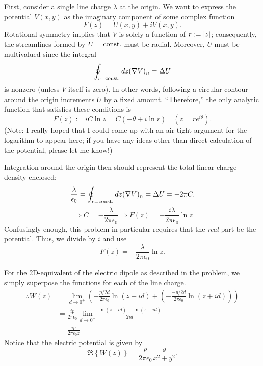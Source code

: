 \item

First, consider a single line charge $\lambda$ at the origin.
We want to express the potential $V(x, y)$ as the imaginary component of some complex function
\[
    F(z) = U(x, y) + iV(x, y).
\]
Rotational symmetry implies that $V$ is solely a function of $r := \left| z \right|$;
consequently, the streamlines formed by $U = \text{const.}$ must be radial.
Moreover, $U$ must be multivalued since the integral
\[
    \oint_{r = \text{const.}} dz (\nabla V)_n  = \Delta U
\]
is nonzero (unless $V$ itself is zero).
In other words, following a circular contour around the origin increments $U$ by a fixed amount.
``Therefore,'' the only analytic function that satisfies these conditions is
\[
    F(z)
    := iC \ln z
    = C \left( -\theta + i\ln r \right) \quad (z = re^{i\theta}).
\]
(Note: I really hoped that I could come up with an air-tight argument for the logarithm to appear here;
if you have any ideas other than direct calculation of the potential, please let me know!)

Integration around the origin then should represent the total linear charge density enclosed:
\[
    \frac{\lambda}{\epsilon_0}
    = \oint_{r = \text{const.}} dz (\nabla V)_n 
    = \Delta U
    = -2\pi C.
\]
\[
    \Rightarrow C = -\frac{\lambda}{2\pi\epsilon_0}
    \Rightarrow F(z) = -\frac{i\lambda}{2\pi\epsilon_0} \ln z
\]
Confusingly enough, this problem in particular requires that the \emph{real} part be the potential.
Thus, we divide by $i$ and use
\[
    F(z) = -\frac{\lambda}{2\pi\epsilon_0} \ln z.
\]

For the 2D-equivalent of the electric dipole as described in the problem,
we simply superpose the functions for each of the line charge.
\begin{align*}
    \therefore W(z)
    &= \lim_{d \rightarrow 0^+} \left(
        -\frac{p/2d}{2\pi\epsilon_0} \ln (z - id)
        + \left( -\frac{-p/2d}{2\pi\epsilon_0} \ln (z + id) \right)
    \right) \\
    &= \frac{ip}{2\pi\epsilon_0} \lim_{d \rightarrow 0^+} \frac{
        \ln (z + id) - \ln (z - id)
    }{2id} \\
    &= \frac{ip}{2\pi\epsilon_0 z}
\end{align*}
Notice that the electric potential is given by
\[
    \Re \left\{ W(z) \right\}
    = \frac{p}{2\pi\epsilon_0} \frac{y}{x^2 + y^2}.
\]
